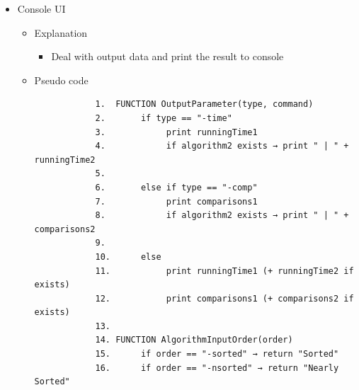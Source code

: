 \begin{itemize}
\begin{itemize}
\begin{verbatim}
            8.       create command
            9.
            10.      command.mode = argv[1]
            11.      command.algorithm1 = argv[2]
            12.
            13.      if command.mode == "-a"
            14.           if isNumber(argv[3])
            15.                command.inputSize = toInteger(argv[3])
            16.           else
            17.                command.inputFile = argv[3]
            18.
            19.           if argc == 5
            20.                command.outputParameter = argv[4]
            21.           else
            22.                command.inputOrder = argv[4]
            23.                command.outputParameter = argv[5]
            24.
            25.      else if command.mode == "-c"
            26.           command.algorithm2 = argv[3]
            27.
            28.           if isNumber(argv[4])
            29.                command.inputSize = toInteger(argv[4])
            30.                command.inputOrder = argv[5]
            31.           else
            32.                command.inputFile = argv[4]
            33.
            34.      return command
        \end{verbatim}
    \end{itemize}
    \item Console UI
    \begin{itemize}
        \item Explanation
        \begin{itemize}
            \item Deal with output data and print the result to console
        \end{itemize}
        \item Pseudo code
        \begin{verbatim}
            1.  FUNCTION OutputParameter(type, command)
            2.       if type == "-time"
            3.            print runningTime1
            4.            if algorithm2 exists → print " | " + runningTime2
            5.
            6.       else if type == "-comp"
            7.            print comparisons1
            8.            if algorithm2 exists → print " | " + comparisons2
            9.
            10.      else
            11.           print runningTime1 (+ runningTime2 if exists)
            12.           print comparisons1 (+ comparisons2 if exists)
            13.
            14. FUNCTION AlgorithmInputOrder(order)
            15.      if order == "-sorted" → return "Sorted"
            16.      if order == "-nsorted" → return "Nearly Sorted"

\end{verbatim}
\end{itemize}
\end{itemize}
